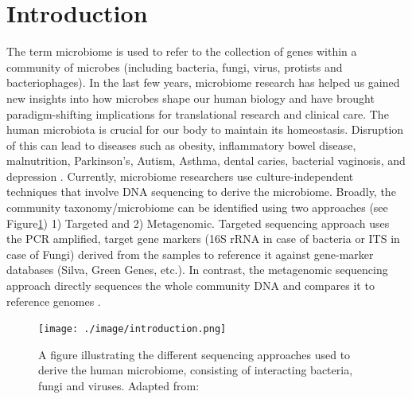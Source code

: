 \section{Introduction}

The term microbiome is used to refer to the collection of genes within a community of microbes (including bacteria, fungi, virus, protists and bacteriophages). In the last few years, microbiome research has helped us gained new insights into how microbes shape our human biology and have brought paradigm-shifting implications for translational research and clinical care. The human microbiota is crucial for our body to maintain its homeostasis. Disruption of this can lead to diseases such as obesity, inflammatory bowel disease, malnutrition, Parkinson's, Autism, Asthma, dental caries, bacterial vaginosis, and depression \cite{Knight2017}.  Currently, microbiome researchers use culture-independent techniques that involve DNA sequencing to derive the microbiome. Broadly, the community taxonomy/microbiome can be identified using two approaches (see Figure\ref{fig1}) 1) Targeted and 2) Metagenomic. Targeted sequencing approach uses the PCR amplified, target gene markers (16S rRNA in case of bacteria or ITS in case of Fungi) derived from the samples to reference it against gene-marker databases (Silva, Green Genes, etc.). In contrast, the metagenomic sequencing approach directly sequences the whole community DNA and compares it to reference genomes \cite{Morgan2012}.

\begin{figure}[ht]
	\centering
	\texttt{[image: ./image/introduction.png]}
	\caption{A figure illustrating the different sequencing approaches used to derive the human microbiome, consisting of interacting bacteria, fungi and viruses. Adapted from: \cite{Morgan2012}}
	\label{fig1}
\end{figure}

